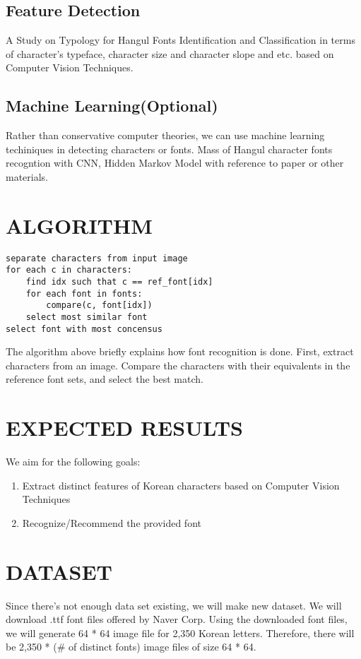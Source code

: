 \documentclass[%
 reprint,
nofootinbib,
nobibnotes,
amsmath,amssymb,
aps,
]{revtex4-1}
\begin{document}
\subsection{\label{sec:level3} Feature Detection}
A Study on Typology for Hangul Fonts Identification and Classification in
terms of character's typeface, character size and character slope and etc.
based on Computer Vision Techniques.

\subsection{\label{sec:level3} Machine Learning(Optional)}
Rather than conservative computer theories, we can use machine learning techiniques
in detecting characters or fonts.
Mass of Hangul character fonts recogntion with CNN, Hidden Markov Model with
reference to paper\cite{tensmeyer} or other materials.

\pagebreak
\section{\label{sec:level3} ALGORITHM}

\begin{lstlisting}
separate characters from input image
for each c in characters:
	find idx such that c == ref_font[idx]
	for each font in fonts:
		compare(c, font[idx])
	select most similar font
select font with most concensus
\end{lstlisting}
The algorithm above briefly explains how font recognition is done. First, extract
characters from an image. Compare the characters with their equivalents in the
reference font sets, and select the best match.

\section{\label{sec:level2}EXPECTED RESULTS}
We aim for the following goals:
\begin{enumerate}[topsep=0pt, itemsep=-1ex, partopsep=1ex, parsep=1ex]
  \item Extract distinct features of Korean characters based on Computer Vision
    Techniques
  \item Recognize/Recommend the provided font
\end{enumerate}

\section{\label{sec:level2}DATASET}
Since there's not enough data set existing, we will make new dataset.
We will download .ttf font files offered by Naver Corp.
Using the downloaded font files, we will generate 64 * 64 image file for 2,350 Korean letters.
Therefore, there will be 2,350 * (\# of distinct fonts) image files of size 64 * 64.
\end{document}
